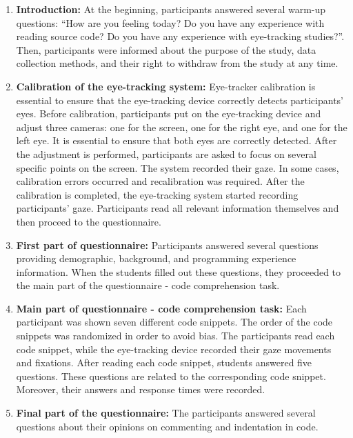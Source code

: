 \begin{enumerate}
    \item \textbf{Introduction:} At the beginning, participants answered several warm-up questions: “How are you feeling today? Do you have any experience with reading source code? Do you have any experience with eye-tracking studies?”. Then, participants were informed about the purpose of the study, data collection methods, and their right to withdraw from the study at any time.

    \item \textbf{Calibration of the eye-tracking system:} 
    Eye-tracker calibration is essential to ensure that the eye-tracking device correctly detects participants’ eyes. Before calibration, participants put on the eye-tracking device and adjust three cameras: one for the screen, one for the right eye, and one for the left eye. It is essential to ensure that both eyes are correctly detected. After the adjustment is performed, participants are asked to focus on several specific points on the screen. The system recorded their gaze. In some cases, calibration errors occurred and recalibration was required. After the calibration is completed, the eye-tracking system started recording participants’ gaze. Participants read all relevant information themselves and then proceed to the questionnaire.
    
    \item \textbf{First part of questionnaire:}  
    Participants answered several questions providing demographic, background, and programming experience information. When the students filled out these questions, they proceeded to the main part of the questionnaire - code comprehension task.

    \item \textbf{Main part of questionnaire - code comprehension task:}  Each participant was shown seven different code snippets. The order of the code snippets was randomized in order to avoid bias. The participants read each code snippet, while the eye-tracking device recorded their gaze movements and fixations. After reading each code snippet, students answered five questions. These questions are related to the corresponding code snippet. Moreover, their answers and response times were recorded.

    \item \textbf{Final part of the questionnaire:} 
    The participants answered several questions about their opinions on commenting and indentation in code.


\end{enumerate}
